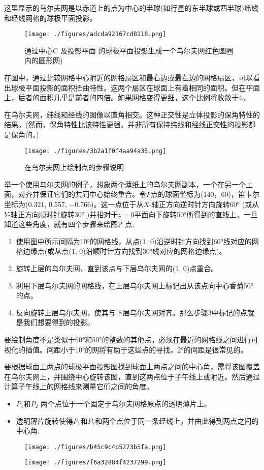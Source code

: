 这里显示的乌尔夫网是以赤道上的点为中心的半球(如行星的东半球或西半球)纬线和经线网格的球极平面投影。
\begin{figure}[ht]
\centering
\texttt{[image: ./figures/adcda92167cd8118.png]}
\caption{通过中心C 及投影平面 的球极平面投影生成一个乌尔夫网红色圆圈内的圆形网)} \label{fig_QJPMTY_11}
\end{figure}
在图中，通过比较网格中心附近的网格扇区和最右边或最左边的网格扇区，可以看出球极平面投影的面积扭曲特性。这两个扇区在球面上有着相同的面积。但在平面上，后者的面积几乎是前者的四倍。如果网格变得更细，这个比例将收敛于4。

在乌尔夫网，纬线和经线的图像以直角相交。这种正交性是立体投影的保角特性的结果。(然而，保角特性比该特性更强。并非所有保持纬线和经线正交性的投影都是保角的。)
\begin{figure}[ht]
\centering
\texttt{[image: ./figures/3b2a1f0f4aa94a35.png]}
\caption{在乌尔夫网上绘制点的步骤说明} \label{fig_QJPMTY_12}
\end{figure}
举一个使用乌尔夫网的例子，想象两个薄纸上的乌尔夫网副本，一个在另一个上面，对齐并保证它们的共同中心始终重合。令$P$点的球面坐标为(140，60)，笛卡尔坐标为(0.321, 0.557, −0.766)。这一点位于从\(X\)-轴正方向逆时针方向旋转60° (或从\(Y\)-轴正方向顺时针旋转30° )并相对于$z = 0$平面向下旋转50°所得到的直线上。一旦知道这些角度，就有四个步骤来绘图P 点:
\begin{enumerate}
\item 使用图中所示间隔为10°的网格线，从点(1, 0)沿逆时针方向找到60°线对应的网格边缘点(或从点(1, 0)沿顺时针方向找到30°线对应的网格边缘点)。
\item 旋转上层的乌尔夫网，直到该点与下层乌尔夫网的(1, 0)点重合。
\item 利用下层乌尔夫网的网格线，在上层乌尔夫网上标记出从该点向中心香菊50°的点。
\item 反向旋转上层乌尔夫网，使其与下层乌尔夫网对齐。那么步骤3中标记的点就是我们想要得到的投影。
\end{enumerate}
要绘制角度不是类似于60°和50°的整数的其他点，必须在最近的网格线之间进行可视化的插值。间距小于10°的网将有助于这些点的寻找。2°的间距是很常见的。

要根据球面上两点的球极平面投影图找到球面上两点之间的中心角，需将该图覆盖在乌尔夫网上，并围绕中心旋转该图，直到这两点位于子午线上或附近。然后通过计算子午线上的网格线来测量它们之间的角度。
\begin{itemize}
\item $P_1$和$P_2$ 两个点位于一个固定于乌尔夫网格原点的透明薄片上。

\item 透明薄片旋转使得$P_1$和$P_2$和两个点位于同一条经线上，并由此得到两点之间的中心角.
\end{itemize}
\begin{figure}[ht]
\centering
\texttt{[image: ./figures/b45c9c4b5273b5fa.png]}
\caption{} \label{fig_QJPMTY_13}
\end{figure}
\begin{figure}[ht]
\centering
\texttt{[image: ./figures/f6a32884f4237299.png]}
\caption{} \label{fig_QJPMTY_15}
\end{figure}

